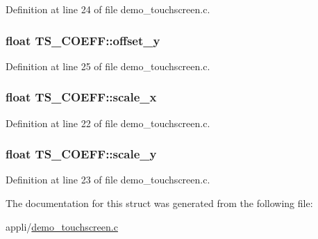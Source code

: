 Definition at line 24 of file demo\+\_\+touchscreen.\+c.

\hypertarget{struct_t_s___c_o_e_f_f_a81877de42fb3b63758119c416958dcfe}{}
\subsubsection[{offset\+\_\+y}]{\setlength{\rightskip}{0pt plus 5cm}float T\+S\+\_\+\+C\+O\+E\+F\+F\+::offset\+\_\+y}\label{struct_t_s___c_o_e_f_f_a81877de42fb3b63758119c416958dcfe}


Definition at line 25 of file demo\+\_\+touchscreen.\+c.

\hypertarget{struct_t_s___c_o_e_f_f_ab628a15e6f11ae3458a61b34e4fb073a}{}
\subsubsection[{scale\+\_\+x}]{\setlength{\rightskip}{0pt plus 5cm}float T\+S\+\_\+\+C\+O\+E\+F\+F\+::scale\+\_\+x}\label{struct_t_s___c_o_e_f_f_ab628a15e6f11ae3458a61b34e4fb073a}


Definition at line 22 of file demo\+\_\+touchscreen.\+c.

\hypertarget{struct_t_s___c_o_e_f_f_aaaa411fa3ff9762afb033922e4b8417c}{}
\subsubsection[{scale\+\_\+y}]{\setlength{\rightskip}{0pt plus 5cm}float T\+S\+\_\+\+C\+O\+E\+F\+F\+::scale\+\_\+y}\label{struct_t_s___c_o_e_f_f_aaaa411fa3ff9762afb033922e4b8417c}


Definition at line 23 of file demo\+\_\+touchscreen.\+c.



The documentation for this struct was generated from the following file\+:\begin{DoxyCompactItemize}
\item 
appli/\hyperlink{demo__touchscreen_8c}{demo\+\_\+touchscreen.\+c}\end{DoxyCompactItemize}

